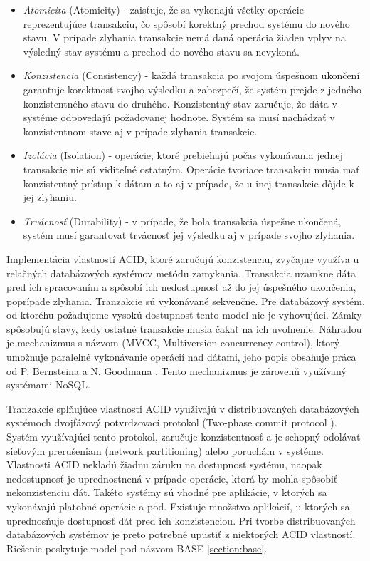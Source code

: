 \documentclass[11pt,twoside,a4paper]{book}
\begin{document}
\begin{itemize}
  \item \emph{Atomicita} (Atomicity) - zaisťuje, že sa vykonajú všetky operácie reprezentujúce transakciu, čo spôsobí korektný prechod systému do nového stavu. V prípade zlyhania transakcie nemá daná operácia žiaden vplyv na výsledný stav systému a prechod do nového stavu sa nevykoná.
  \item \emph{Konzistencia} (Consistency) - každá transakcia po svojom úspešnom ukončení garantuje korektnosť svojho výsledku a zabezpečí, že systém prejde z jedného konzistentného stavu do druhého. Konzistentný stav zaručuje, že dáta v systéme odpovedajú požadovanej hodnote. Systém sa musí nachádzať v konzistentnom stave aj v prípade zlyhania transakcie.
  \item \emph{Izolácia} (Isolation) - operácie, ktoré prebiehajú počas vykonávania jednej transakcie nie sú viditeľné ostatným. Operácie tvoriace transakciu musia mať konzistentný prístup k dátam a to aj v prípade, že u inej transakcie dôjde k jej zlyhaniu.
  \item \emph{Trvácnosť} (Durability) - v prípade, že bola transakcia úspešne ukončená, systém musí garantovať trvácnosť jej výsledku aj v prípade svojho zlyhania.
\end{itemize}
Implementácia vlastností ACID, ktoré zaručujú konzistenciu, zvyčajne využíva u relačných databázových systémov metódu zamykania. Transakcia uzamkne dáta pred ich spracovaním a spôsobí ich nedostupnosť až do jej úspešného ukončenia, poprípade zlyhania. Tranzakcie sú vykonávané sekvenčne. Pre databázový systém, od ktoréhu požadujeme vysokú dostupnosť tento model nie je vyhovujúci. Zámky spôsobujú stavy, kedy ostatné transakcie musia čakať na ich uvoľnenie. Náhradou je mechanizmus s názvom  (MVCC, Multiversion concurrency control), ktorý umožnuje paralelné vykonávanie operácií nad dátami, jeho popis obsahuje práca od P. Bernsteina a N. Goodmana \cite{bernstein1981concurrency}. Tento mechanizmus je zárovenň využívaný systémami NoSQL.


Tranzakcie splňujúce vlastnosti ACID využívajú v distribuovaných databázových systémoch dvojfázový potvrdzovací protokol (Two-phase commit protocol \cite{bernstein1987concurrency}). Systém využívajúci tento protokol, zaručuje konzistentnosť a je schopný odolávať sieťovým prerušeniam (network partitioning) alebo poruchám v systéme. Vlastnosti ACID nekladú žiadnu záruku na dostupnosť systému, naopak nedostupnosť je uprednostnená v prípade operácie, ktorá by mohla spôsobiť nekonzistenciu dát. Takéto systémy sú vhodné pre aplikácie, v ktorých sa vykonávajú platobné operácie a pod. Existuje množstvo aplikácií, u ktorých sa uprednosňuje dostupnosť dát pred ich konzistenciou. Pri tvorbe distribuovaných databázových systémov je preto potrebné upustiť z niektorých ACID vlastností. Riešenie poskytuje model pod názvom BASE \ref{section:base}.
\end{document}
